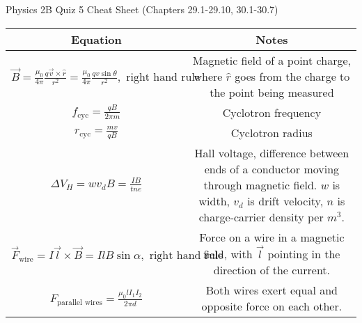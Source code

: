 \documentclass{article}
\begin{document}
\LARGE Physics 2B Quiz 5 Cheat Sheet (Chapters 29.1-29.10, 30.1-30.7)

\hrulefill
\normalsize

\begin{center}
	\begin{tabular}{|c|c|}
		\hline Equation                                             & Notes                                                    \\

		\hline $\vec B = \frac{\mu_0}{4 \pi} \frac{q \vec v \times \hat r}{r^2}
			= \frac{\mu_0}{4 \pi} \frac{q v \sin \theta }{r^2}, \text{ right hand rule}$
		                                                            & \makecell{Magnetic field of a point charge,              \\
		where $\hat r$ goes from the charge to the point being measured}                                                       \\

		$f_\text{cyc} = \frac{qB}{2 \pi m}$                         & Cyclotron frequency                                      \\

		$r_\text{cyc} = \frac{mv}{qB}$                              & Cyclotron radius                                         \\

		$\Delta V_H = w v_d B = \frac{IB}{tne}$                     &
		\makecell{Hall voltage, difference between ends of a conductor                                                         \\
		moving through magnetic field. $w$ is width, $v_d$ is drift velocity,                                                  \\
		$n$ is charge-carrier density per $m^3$.}                                                                              \\

		$\vec F_\text{wire} = I \vec l \times
		\vec B = IlB \sin \alpha, \text{ right hand rule}$          &
		\makecell{Force on a wire in a magnetic field, with $\vec l$                                                           \\
		pointing in the direction of the current.}                                                                             \\

		$F_\text{parallel wires} = \frac{\mu_0 l I_1 I_2}{2 \pi d}$ & Both wires exert equal and opposite force on each other. \\

		\hline
	\end{tabular}
\end{center}
\end{document}

